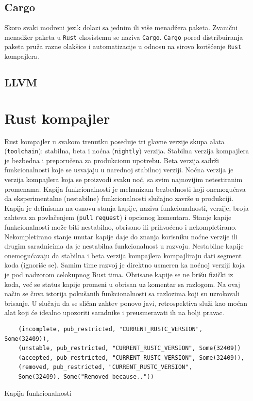 \documentclass[11pt]{article}
\begin{document}
\subsection{Cargo}

Skoro svaki modreni jezik dolazi sa jednim ili više menadžera paketa. Zvanični menadžer paketa u \verb|Rust|
ekosistemu se naziva \verb|Cargo|. \verb|Cargo| pored distribuiranja paketa pruža razne olakšice i automatizacije 
u odnosu na sirovo korišćenje \verb|Rust| kompajlera.

\subsection{LLVM}


\newpage
\section{Rust kompajler}

Rust kompajler u svakom trenutku poseduje tri glavne verzije skupa alata (\verb|toolchain|): stabilna, beta i noćna (\verb|nightly|) verzija.
Stabilna verzija kompajlera je bezbedna i preporučena za produkcionu upotrebu. Beta verzija sadrži funkcionalnosti
koje se usvajaju u narednoj stabilnoj verziji. Noćna verzija je verzija kompajlera koja se 
proizvodi svaku noć, sa svim najnovijim netestiranim promenama. Kapija funkcionalnosti je mehanizam bezbednosti
koji onemogućava da eksperimentalne (nestabilne) funkcionalnosti slučajno završe u produkciji. 
Kapija je definisana na osnovu stanja kapije, naziva funkcionalnosti, verzije, broja zahteva za povlačenjem
(\verb|pull| \verb|request|) i opcionog komentara.
Stanje kapije funkcionalnosti može biti nestabilno, obrisano ili prihvaćeno i nekompletirano. Nekompletirano 
stanje unutar kapije daje do znanja korisniku noćne verzije ili drugim saradnicima da je nestabilna funkcionalnost 
u razvoju.  Nestabilne kapije onemogućavaju da stabilna i beta verzija kompajlera kompajliraju 
dati segment koda (ignoriše se).  Samim time razvoj je direktno 
usmeren ka noćnoj verziji koja je pod nadzorom celokupnog Rust tima. Obrisane kapije se ne brišu fizički iz koda,
već se status kapije promeni u obrisan uz komentar sa razlogom. Na ovaj način se čuva istorija pokušanih 
funkcionalnosti sa razlozima koji su uzrokovali brisanje. U slučaju da se sličan zahtev ponovo javi, retrospektiva
služi kao moćan alat koji će idealno upozoriti saradnike i preusmeravati ih na bolji pravac.

\begin{listing}[H]
\begin{verbatim}
    (incomplete, pub_restricted, "CURRENT_RUSTC_VERSION", Some(32409)),
    (unstable, pub_restricted, "CURRENT_RUSTC_VERSION", Some(32409))
    (accepted, pub_restricted, "CURRENT_RUSTC_VERSION", Some(32409)),
    (removed, pub_restricted, "CURRENT_RUSTC_VERSION", 
    Some(32409), Some("Removed because.."))
\end{verbatim}
\caption{Kapija funkcionalnosti}
\label{lst:rustup_set}
\end{listing}
\end{document}
